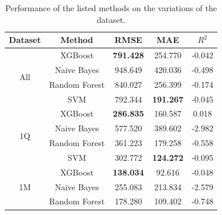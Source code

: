 \documentclass[conference,compsoc]{IEEEtran}
\begin{document}
\begin{table}[!t]
	\label{model-performance}
	\centering
	\caption{Performance of the listed methods on the variations of the dataset.}
	\begin{tabular}{c|c|c|c|c}
		Dataset & Method & RMSE & MAE & $R^2$ \\
		\hline
		\multirow{4}{*}{All}
		&XGBoost& \textbf{791.428} & 254.770 & -0.042 \\
		&Naive Bayes& 948.649 & 420.036 & -0.498 \\
		&Random Forest& 840.027 & 256.399 & -0.174 \\
		& SVM & 792.344 & \textbf{191.267} & -0.045 \\
		\hline
		\multirow{4}{*}{1Q}
		&XGBoost& \textbf{286.835} & 160.587 & 0.018 \\
		&Naive Bayes& 577.520 & 389.602 & -2.982 \\
		&Random Forest& 361.223 & 179.258 & -0.558 \\
		& SVM & 302.772 & \textbf{124.272} & -0.095 \\
		\hline
		\multirow{4}{*}{1M}
		&XGBoost& \textbf{138.034} & 92.616 & -0.048 \\
		&Naive Bayes& 255.083 & 213.834 & -2.579 \\
		&Random Forest& 178.280 & 109.402 & -0.748 \\

\end{tabular}
\end{table}
\end{document}
